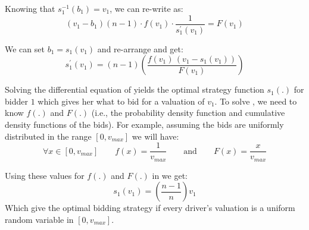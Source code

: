Knowing that $s_1^{-1}\left(b_1\right) = v_1$, we can re-write  as:
\begin{equation}
\label{eq:differ1}
\left(v_1 - b_1\right)\left(n-1\right)\cdot f\left(v_1\right)\cdot\frac{1}{s_1^\prime\left(v_1\right)} = F\left(v_1\right)
\end{equation}

We can set $b_1 = s_1\left(v_1\right)$ and re-arrange  and get:
\begin{equation}
\label{eq:differ2}
s_1^\prime\left(v_1\right) = \left(n-1\right)\left(\frac{f\left(v_1\right)\,\left(v_1 - s_1\left(v_1\right)\right)}{F\left(v_1\right)}\right)
\end{equation}

Solving the differential equation of  yields the optimal strategy function $s_1(.)$ for bidder $1$ which gives her what to bid for a valuation of $v_1$. To solve , we need to know $f(.)$ and $F(.)$ (i.e., the probability density function and cumulative density functions of the bids). For example, assuming the bids are uniformly distributed in the range $\left[0,v_{max}\right]$ we will have:
\begin{equation*}
\forall x \in \left[0, v_{max}\right] \quad\quad f(x) = \frac{1}{v_{max}} \quad\quad \textrm{and} \quad\quad F(x) = \frac{x}{v_{max}}
\end{equation*}

Using these values for $f(.)$ and $F(.)$ in  we get:
\begin{equation}
\label{eq:bid}
s_1(v_1) = \left(\frac{n-1}{n} \right) v_1
\end{equation}
Which give the optimal bidding strategy if every driver's valuation is a uniform random variable in $\left[0,v_{max}\right]$.

